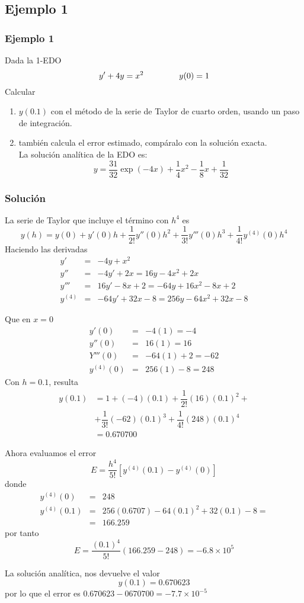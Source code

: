 \subsection{Ejemplo 1}
\begin{frame}
\frametitle{Ejemplo 1}
Dada la 1-EDO
\[ y' + 4y = x^{2} \hspace{1.5cm} y(0)=1 \]
Calcular 
\begin{enumerate}
\item $y(0.1)$ con el método de la serie de Taylor de cuarto orden, usando un paso de integración.
\item  también calcula el error estimado, compáralo con la solución exacta.
\\
\medskip
La solución analítica de la EDO es:
\[ y =  \dfrac{31}{32} \exp(-4x) + \dfrac{1}{4} x^{2} - \dfrac{1}{8} x + \dfrac{1}{32} \]
\end{enumerate}
\end{frame}
\begin{frame}
\frametitle{Solución}
La serie de Taylor que incluye el término con $h^{4}$ es
\[ y(h) = y(0) + y'(0)h + \dfrac{1}{2!} y''(0)h^{2} + \dfrac{1}{3!} y'''(0)h^{3} + \dfrac{1}{4!} y^{(4)}(0) h^{4} \]
Haciendo las derivadas
\begin{eqnarray*}
y' &=& -4y + x^{2} \\
y'' &=& -4y' + 2x = 16y - 4x^{2}+2x \\
y''' &=& 16y' - 8x + 2 = -64y + 16x^{2} - 8x + 2 \\
y^{(4)} &=& -64 y'+32x-8 = 256y - 64x^{2}+32x-8 
\end{eqnarray*}
\end{frame}
\begin{frame}
Que en $x=0$
\begin{eqnarray*}
y'(0) &=& -4(1) = -4 \\
y''(0) &=& 16(1) = 16 \\
Y'''(0) &=& -64(1) + 2 = -62 \\
y^{(4)}(0) &=& 256(1) - 8 = 248
\end{eqnarray*}
Con $h=0.1$, resulta
\[ \begin{split}
y(0.1) &= 1 + (-4)(0.1) + \dfrac{1}{2!}(16)(0.1)^{2} + \\ &+ \dfrac{1}{3!} (-62)(0.1)^{3} + \dfrac{1}{4!} (248)(0.1)^{4} \\
&= 0.670700 \end{split}
\]
\end{frame}
\begin{frame}
Ahora evaluamos el error
\[ E = \dfrac{h^{4}}{5!} \left[ y^{(4)}(0.1) - y^{(4)}(0) \right]\]
donde
\begin{eqnarray*}
y^{(4)} (0) &=& 248 \\
y^{(4)} (0.1) &=& 256(0.6707)-64(0.1)^{2} + 32(0.1)-8 = \\    
&=&166.259
\end{eqnarray*}
por tanto
\[ E = \dfrac{(0.1)^{4}}{5!} (166.259-248) = -6.8 \times 10^{5}\]
\end{frame}
\begin{frame}
La solución analítica, nos devuelve el valor
\[ y(0.1) = 0.670623 \]
por lo que el error es $0.670623 - 0670700= -7.7 \times 10^{-5}$
\end{frame}
